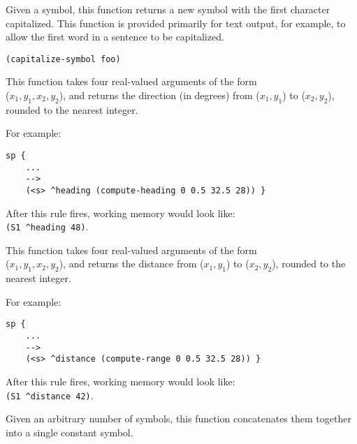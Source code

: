 \begin{description}
\item [\soarb{capitalize-symbol} --- ] Given a symbol, this function returns a
	new symbol with the first character capitalized. This function is
	provided primarily for text output, for example, to allow the first
        word in a sentence to be capitalized.


\begin{verbatim}
(capitalize-symbol foo)
\end{verbatim}


\item [\soarb{compute-heading} --- ] This function takes four real-valued arguments of the form \\
($x_1, y_1, x_2, y_2$), and returns the direction (in degrees) from ($x_1, y_1$)
to ($x_2, y_2$), rounded to the nearest integer.

For example:

\begin{verbatim}
sp {
    ...
    -->
    (<s> ^heading (compute-heading 0 0.5 32.5 28)) }
\end{verbatim}

After this rule fires, working memory would look like: \\
\verb|(S1 ^heading 48)|.


\item [\soarb{compute-range} --- ] This function takes four real-valued arguments of the form \\
($x_1, y_1, x_2, y_2$), and returns the distance from ($x_1, y_1$) to ($x_2, y_2$), rounded to the nearest integer.

For example:

\begin{verbatim}
sp {
    ...
    -->
    (<s> ^distance (compute-range 0 0.5 32.5 28)) }
\end{verbatim}

After this rule fires, working memory would look like: \\
\verb|(S1 ^distance 42)|.


\item [\soarb{concat} --- ] Given an arbitrary number of symbols, this function
        concatenates them together into a single constant symbol. 


\end{description}
